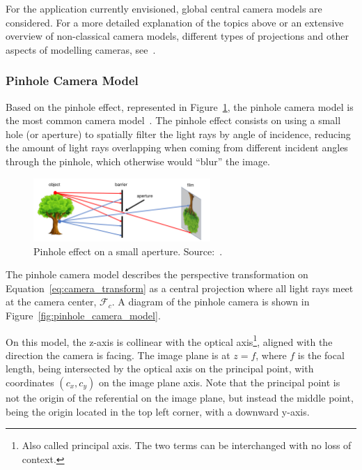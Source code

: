 For the application currently envisioned, global central camera models are considered. For a more detailed explanation of the topics above or an extensive overview of non-classical camera models, different types of projections and other aspects of modelling cameras, see~\cite{Sturm2010, camera_models}.

\subsubsection{Pinhole Camera Model}
Based on the pinhole effect, represented in Figure~\ref{fig:pinhole_effect}, the pinhole camera model is the most common camera model~\cite{camera_models}. The pinhole effect consists on using a small hole (or aperture) to spatially filter the light rays by angle of incidence, reducing the amount of light rays overlapping when coming from different incident angles through the pinhole, which otherwise would ``blur'' the image. 

\begin{figure}[!ht]
	\centering
	\includegraphics[width=0.6\textwidth]{img/camera/pnhole_effect.png}
	\caption[Pinhole effect on a small aperture.]{Pinhole effect on a small aperture. Source:~\cite{camera_models}.}
	\label{fig:pinhole_effect}
\end{figure}

The pinhole camera model describes the perspective transformation on Equation~\eqref{eq:camera_transform} as a central projection where all light rays meet at the camera center, $\mathcal{F}_c$. A diagram of the pinhole camera is shown in Figure~\ref{fig:pinhole_camera_model}. 

On this model, the z-axis is collinear with the optical axis\footnote{Also called principal axis. The two terms can be interchanged with no loss of context.}, aligned with the direction the camera is facing. The image plane is at $z = f$, where $f$ is the focal length, being intersected by the optical axis on the principal point, with coordinates $(c_x, c_y)$ on the image plane axis. Note that the principal point is not the origin of the referential on the image plane, but instead the middle point, being the origin located in the top left corner, with a downward y-axis.

